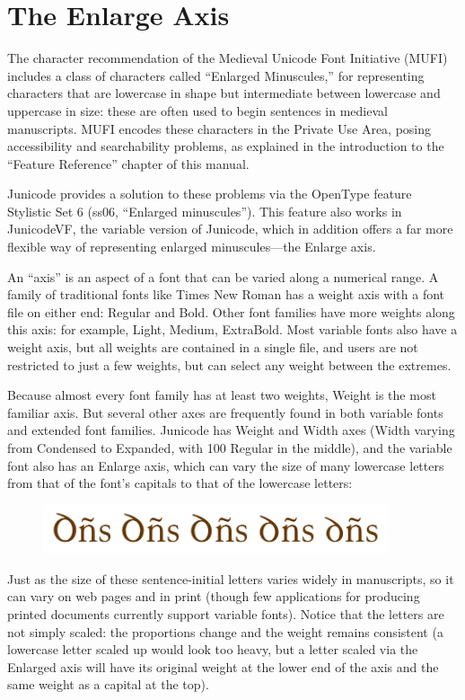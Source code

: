 \chapter{The Enlarge Axis}

The character recommendation of the Medieval Unicode Font Initiative (MUFI) includes a class of characters called “Enlarged Minuscules,” for representing characters that are lowercase in shape but intermediate between lowercase and uppercase in size: these are often used to begin sentences in medieval manuscripts. MUFI encodes these characters in the Private Use Area, posing accessibility and searchability problems, as explained in the introduction to the “Feature Reference” chapter of this manual.

Junicode provides a solution to these problems via the OpenType feature Stylistic Set 6 (ss06, “Enlarged minuscules”). This feature also works in JunicodeVF, the variable version of Junicode, which in addition offers a far more flexible way of representing enlarged minuscules—the Enlarge axis.

An “axis” is an aspect of a font that can be varied along a numerical range. A family of traditional fonts like Times New Roman has a weight axis with a font file on either end: Regular and Bold. Other font families have more weights along this axis: for example, Light, Medium, ExtraBold. Most variable fonts also have a weight axis, but all weights are contained in a single file, and users are not restricted to just a few weights, but can select any weight between the extremes.

Because almost every font family has at least two weights, Weight is the most familiar axis. But several other axes are frequently found in both variable fonts and extended font families. Junicode has Weight and Width axes (Width varying from { Condensed} to { Expanded}, with 100 Regular in the middle), and the variable font also has an Enlarge axis, which can vary the size of many lowercase letters from that of the font's capitals to that of the lowercase letters:
\begin{figure}[h!]
  \centering\includegraphics[width=4in]{dns.png}
\end{figure}
Just as the size of these sentence-initial letters varies widely in manuscripts, so it can vary on web pages and in print (though few applications for producing printed documents currently support variable fonts). Notice that the letters are not simply scaled: the proportions change and the weight remains consistent (a lowercase letter scaled up would look too heavy, but a letter scaled via the Enlarged axis will have its original weight at the lower end of the axis and the same weight as a capital at the top).

